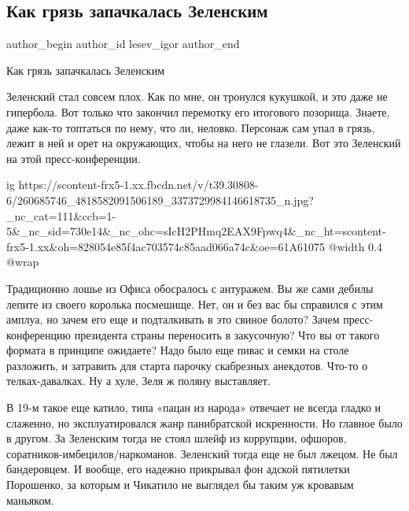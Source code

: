  
 
 
 
 
 
\subsection{Как грязь запачкалась Зеленским}
\label{sec:26_11_2021.fb.lesev_igor.1.grjazj_zelenskij}
 
\ifcmt
 author_begin
   author_id lesev_igor
 author_end
\fi

Как грязь запачкалась Зеленским

Зеленский стал совсем плох. Как по мне, он тронулся кукушкой, и это даже не
гипербола. Вот только что закончил перемотку его итогового позорища. Знаете,
даже как-то топтаться по нему, что ли, неловко. Персонаж сам упал в грязь,
лежит в ней и орет на окружающих, чтобы на него не глазели. Вот это Зеленский
на этой пресс-конференции.

\ifcmt
  ig https://scontent-frx5-1.xx.fbcdn.net/v/t39.30808-6/260685746_4818582091506189_3373729984146618735_n.jpg?_nc_cat=111&ccb=1-5&_nc_sid=730e14&_nc_ohc=sIcH2PHmq2EAX9Fpwq4&_nc_ht=scontent-frx5-1.xx&oh=828054e85f4ac703574c85aad066a74c&oe=61A61075
  @width 0.4
  @wrap 
\fi

Традиционно лошье из Офиса обосралось с антуражем. Вы же сами дебилы лепите из
своего королька посмешище. Нет, он и без вас бы справился с этим амплуа, но
зачем его еще и подталкивать в это свиное болото? Зачем пресс-конференцию
президента страны переносить в закусочную? Что вы от такого формата в принципе
ожидаете? Надо было еще пивас и семки на столе разложить, и затравить для
старта парочку скабрезных анекдотов. Что-то о телках-давалках. Ну а хуле, Зеля
ж поляну выставляет.

В 19-м такое еще катило, типа «пацан из народа» отвечает не всегда гладко и
слаженно, но эксплуатировался жанр панибратской искренности. Но главное было в
другом. За Зеленским тогда не стоял шлейф из коррупции, офшоров,
соратников-имбецилов/наркоманов. Зеленский тогда еще не был лжецом. Не был
бандеровцем. И вообще, его надежно прикрывал фон адской пятилетки Порошенко, за
которым и Чикатило не выглядел бы таким уж кровавым маньяком.

